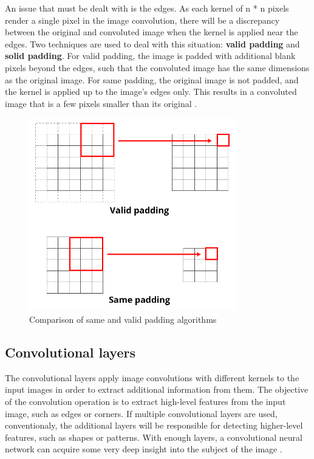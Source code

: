 \documentclass[12pt,a4paper,notitlepage]{article}
\begin{document}
An issue that must be dealt with is the edges. As each kernel of n * n pixels render a single pixel in the image convolution, there will be a discrepancy between the original and convoluted image when the kernel is applied near the edges. Two techniques are used to deal with this situation: \textbf{valid padding} and \textbf{solid padding}. For valid padding, the image is padded with additional blank pixels beyond the edges, such that the convoluted image has the same dimensions as the original image. For same padding, the original image is not padded, and the kernel is applied up to the image's edges only. This results in a convoluted image that is a few pixels smaller than its original \cite{sanderson_convolutions_2020}.

\begin{figure}[htbp]
	\centering
		\includegraphics[width=0.80\textwidth]{images/padding-illustration.png}
	\caption{Comparison of same and valid padding algorithms}
	\label{fig:padding-illustration}
\end{figure}

\subsection{Convolutional layers}\label{cnn-section}
The convolutional layers apply image convolutions with different kernels to the input images in order to extract additional information from them. The objective of the convolution operation is to extract high-level features from the input image, such as edges or corners. If multiple convolutional layers are used, conventionaly, the additional layers will be responsible for detecting higher-level features, such as shapes or patterns. With enough layers, a convolutional neural network can acquire some very deep insight into the subject of the image \cite{saha_comprehensive_2018}.
\end{document}

